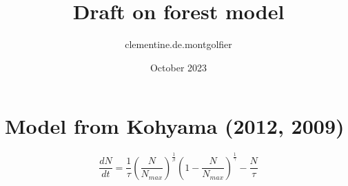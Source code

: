\documentclass{article}
\title{Draft on forest model}
\author{clementine.de.montgolfier }
\date{October 2023}
\begin{document}
\maketitle

\section{Model from Kohyama (2012, 2009)}

\begin{center}
    \begin{equation}
        \frac{dN}{dt} = \frac{1}{\tau} \left( \frac{N}{N_{max}} \right)^{\frac{1}{\beta}} \left( 1 - \frac{N}{N_{max}} \right)^{\frac{1}{\gamma}} - \frac{N}{\tau}
    \end{equation}
\end{center}
\end{document}
